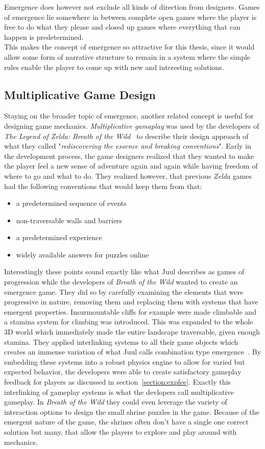 Emergence does however not exclude all kinds of direction from designers. Games of emergence lie somewhere in between complete open games where the player is free to do what they please and closed up games where everything that can happen is predetermined.~\cite{Juul2002}\\ 
This makes the concept of emergence so attractive for this thesis, since it would allow some form of narrative structure to remain in a system where the simple rules enable the player to come up with new and interesting solutions.
\subsection{Multiplicative Game Design}
Staying on the broader topic of emergence, another related concept is useful for designing game mechanics. \textit{Multiplicative gamaplay} was used by the developers of \textit{The Legend of Zelda: Breath of the Wild}~\cite{zeldabotw} to describe their design approach of what they called "\textit{rediscovering the essence and breaking conventions}". Early in the development process, the game designers realized that they wanted to make the player feel a new sense of adventure again and again while having freedom of where to go and what to do. They realized however, that previous \textit{Zelda} games had the following conventions that would keep them from that:
\begin{itemize}
	\item a predetermined sequence of events
	\item non-traversable walls and barriers
	\item a predetermined experience
	\item widely available answers for puzzles online
\end{itemize}
Interestingly these points sound exactly like what Juul describes as games of progression while the developers of \textit{Breath of the Wild} wanted to create an emergence game. They did so by carefully examining the elements that were progressive in nature, removing them and replacing them with systems that have emergent properties. Insurmountable cliffs for example were made climbable and a stamina system for climbing was introduced. This was expanded to the whole 3D world which immediately made the entire landscape traversable, given enough stamina. They applied interlinking systems to all their game objects which creates an immense variation of what Juul calls combination type emergence~\cite{Juul2002}. By embedding these systems into a robust physics engine to allow for varied but expected behavior, the developers were able to create satisfactory gameplay feedback for players as discussed in section~\ref{section:expfee}. Exactly this interlinking of gameplay systems is what the devlopers call multiplicative gameplay. In \textit{Breath of the Wild} they could even leverage the variety of interaction options to design the small shrine puzzles in the game. Because of the emergent nature of the game, the shrines often don't have a single one correct solution but many, that allow the players to explore and play around with mechanics.~\cite{fujibayashi2017}
